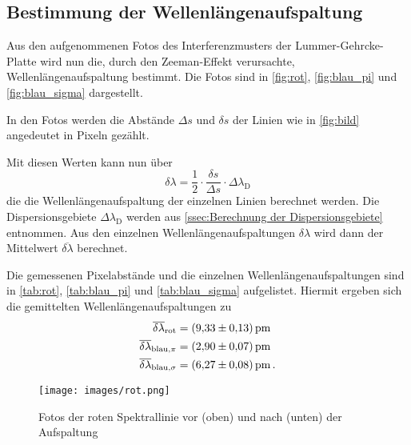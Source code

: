 \subsection{Bestimmung der Wellenlängenaufspaltung}
\label{ssec:Bestimmung der Wellenlängenaufspaltung}

Aus den aufgenommenen Fotos des Interferenzmusters der Lummer-Gehrcke-Platte wird nun die, durch den Zeeman-Effekt verursachte, Wellenlängenaufspaltung bestimmt.
Die Fotos sind in \autoref{fig:rot}, \autoref{fig:blau_pi} und \autoref{fig:blau_sigma} dargestellt.

In den Fotos werden die Abstände $\Delta s$ und $\delta s$ der Linien wie in \autoref{fig:bild} angedeutet in Pixeln gezählt.

Mit diesen Werten kann nun über 
\begin{equation}
    \delta \lambda = \frac{1}{2}\cdot\frac{\delta s}{\Delta s}\cdot\Delta \lambda_\text{D}
    \label{eq:delta_lambda}
\end{equation}
die die Wellenlängenaufspaltung der einzelnen Linien berechnet werden.
Die Dispersionsgebiete $\Delta\lambda_\text{D}$ werden aus \autoref{ssec:Berechnung der Dispersionsgebiete} entnommen.
Aus den einzelnen Wellenlängenaufspaltungen $\delta \lambda$ wird dann der Mittelwert $\overline{\delta\lambda}$ berechnet.

Die gemessenen Pixelabstände und die einzelnen Wellenlängenaufspaltungen sind in \autoref{tab:rot}, \autoref{tab:blau_pi} und \autoref{tab:blau_sigma} aufgelistet.
Hiermit ergeben sich die gemittelten Wellenlängenaufspaltungen zu 
\begin{align*}
    \overline{\delta \lambda}_\text{rot} &= \SI{9.33+-0.13}{\pico\meter} \\
    \overline{\delta \lambda}_{\text{blau,}\pi} &= \SI{2.90+-0.07}{\pico\meter} \\
    \overline{\delta \lambda}_{\text{blau,}\sigma} &= \SI{6.27+-0.08}{\pico\meter} \, .
\end{align*}

\newpage

\begin{figure}[ht]
    \centering
    \texttt{[image: images/rot.png]}
    \caption{Fotos der roten Spektrallinie vor (oben) und nach (unten) der Aufspaltung}
    \label{fig:rot}
\end{figure}

